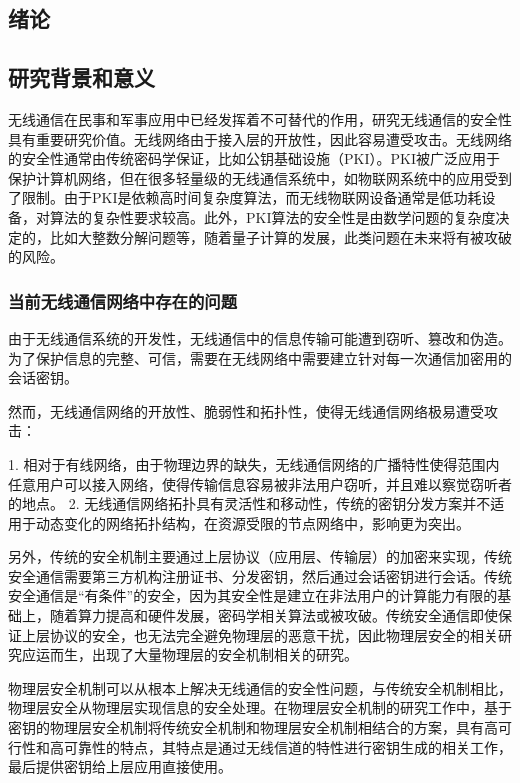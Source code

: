 \documentclass[master]{seuthesis} %
\begin{document}
\begin{Main} %

\chapter{绪论}
\section{研究背景和意义}

无线通信在民事和军事应用中已经发挥着不可替代的作用，研究无线通信的安全性具有重要研究价值。无线网络由于接入层的开放性，因此容易遭受攻击。无线网络的安全性通常由传统密码学保证，比如公钥基础设施（PKI）。PKI被广泛应用于保护计算机网络，但在很多轻量级的无线通信系统中，如物联网系统中的应用受到了限制。由于PKI是依赖高时间复杂度算法，而无线物联网设备通常是低功耗设备，对算法的复杂性要求较高。此外，PKI算法的安全性是由数学问题的复杂度决定的，比如大整数分解问题等，随着量子计算的发展，此类问题在未来将有被攻破的风险。

\subsection{当前无线通信网络中存在的问题}

由于无线通信系统的开发性，无线通信中的信息传输可能遭到窃听、篡改和伪造。为了保护信息的完整、可信，需要在无线网络中需要建立针对每一次通信加密用的会话密钥。

然而，无线通信网络的开放性、脆弱性和拓扑性，使得无线通信网络极易遭受攻击：

1. 相对于有线网络，由于物理边界的缺失，无线通信网络的广播特性使得范围内任意用户可以接入网络，使得传输信息容易被非法用户窃听，并且难以察觉窃听者的地点。
2. 无线通信网络拓扑具有灵活性和移动性，传统的密钥分发方案并不适用于动态变化的网络拓扑结构，在资源受限的节点网络中，影响更为突出。

另外，传统的安全机制主要通过上层协议（应用层、传输层）的加密来实现，传统安全通信需要第三方机构注册证书、分发密钥，然后通过会话密钥进行会话。传统安全通信是“有条件”的安全，因为其安全性是建立在非法用户的计算能力有限的基础上，随着算力提高和硬件发展，密码学相关算法或被攻破。传统安全通信即使保证上层协议的安全，也无法完全避免物理层的恶意干扰，因此物理层安全的相关研究应运而生，出现了大量物理层的安全机制相关的研究。

物理层安全机制可以从根本上解决无线通信的安全性问题，与传统安全机制相比，物理层安全从物理层实现信息的安全处理。在物理层安全机制的研究工作中，基于密钥的物理层安全机制将传统安全机制和物理层安全机制相结合的方案，具有高可行性和高可靠性的特点，其特点是通过无线信道的特性进行密钥生成的相关工作，最后提供密钥给上层应用直接使用。


\end{Main}
\end{document}
